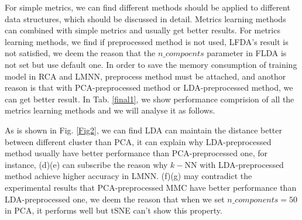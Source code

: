 \documentclass[conference]{IEEEtran}
\begin{document}


For simple metrics, we can find different methods should be applied to different data structures, which should be discussed in detail. Metrics learning methods can combined with simple metrics and usually get better results. For metrics learning methods, we find if preprocessed method is not used, LFDA's result is not satisfied, we deem the reason that the $n\_compoents$ parameter in FLDA is not set but use default one. In order to save the memory consumption of training model in RCA and LMNN, preprocess method must be attached, and anothor reason is that with PCA-preprocessed method or LDA-preprocessed method, we can get better result. In Tab. \ref*{final1}, we show performance comprision of all the metrics learning methods and we will analyse it as follows.

As is shown in Fig. \ref*{Fig2}, we can find LDA can maintain the distance better between different cluster than PCA, it can explain why LDA-preprocessed method usually have better performance than PCA-preprocessed one, for instance, (d)(e) can subscribe the reason why $k-$NN with LDA-preprocessed method achieve higher accuracy in LMNN. (f)(g) may contradict the experimental results that PCA-preprocessed MMC have better performance than LDA-preprocessed one, we deem the reason that when we set $n\_components=50$ in PCA, it performs well but tSNE can't show this property.
\end{document}
